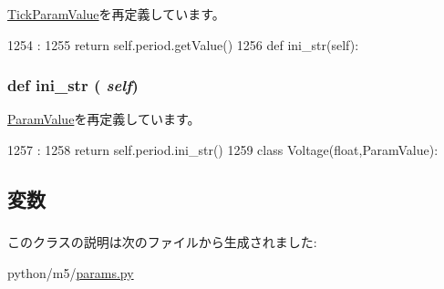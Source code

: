 \hyperlink{classm5_1_1params_1_1TickParamValue_acc340fbd4335fa34f9d57fb454b28ed0}{TickParamValue}を再定義しています。


\begin{DoxyCode}
1254                       :
1255         return self.period.getValue()
1256 
    def ini_str(self):
\end{DoxyCode}
\hypertarget{classm5_1_1params_1_1Clock_a33ebe6cd32bcbd15465fc28b9d94bf82}{
\subsubsection[{ini\_\-str}]{\setlength{\rightskip}{0pt plus 5cm}def ini\_\-str ( {\em self})}}
\label{classm5_1_1params_1_1Clock_a33ebe6cd32bcbd15465fc28b9d94bf82}


\hyperlink{classm5_1_1params_1_1ParamValue_a33ebe6cd32bcbd15465fc28b9d94bf82}{ParamValue}を再定義しています。


\begin{DoxyCode}
1257                      :
1258         return self.period.ini_str()
1259 
class Voltage(float,ParamValue):
\end{DoxyCode}


\subsection{変数}
\hypertarget{classm5_1_1params_1_1Clock_a278a1f181e2be02613530daeaa8afdab}{
\subsubsection[{ticks}]{}}
\label{classm5_1_1params_1_1Clock_a278a1f181e2be02613530daeaa8afdab}
\hypertarget{classm5_1_1params_1_1Clock_afcc7a4b78ecd8fa7e713f8cfa0f51017}{
\subsubsection[{value}]{}}
\label{classm5_1_1params_1_1Clock_afcc7a4b78ecd8fa7e713f8cfa0f51017}


このクラスの説明は次のファイルから生成されました:\begin{DoxyCompactItemize}
\item 
python/m5/\hyperlink{params_8py}{params.py}\end{DoxyCompactItemize}

